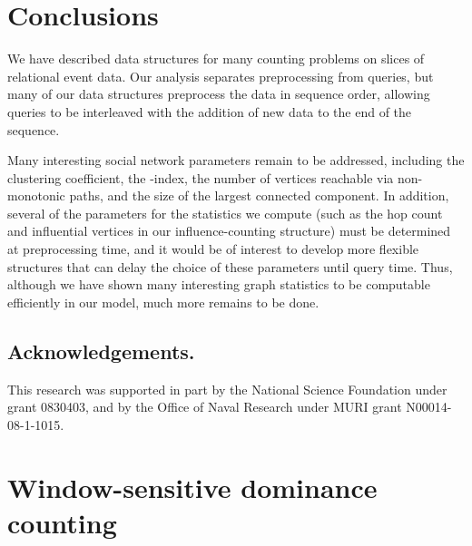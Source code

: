 \documentclass[11pt]{article}
\begin{document}
\section{Conclusions}
We have described data structures for many counting problems on slices of relational event data. Our analysis separates preprocessing from queries,  but many of our data structures preprocess the data in sequence order, allowing queries to be interleaved with the addition of new data to the end of the sequence.

Many interesting social network parameters remain to be addressed, including the clustering coefficient, the -index, the number of vertices reachable via non-monotonic paths, and the size of the largest connected component. In addition, several of the parameters for the statistics we compute (such as the hop count and  influential vertices in our influence-counting structure) must be determined at preprocessing time, and it would be of interest to develop more flexible structures that can delay the choice of these parameters until query time. Thus, although we have shown many interesting graph statistics to be computable efficiently in our model, much more remains to be done.

\newpage

\subsection*{Acknowledgements.}
This research was supported in part by the National Science Foundation under grant 0830403, and by the Office of Naval Research under MURI grant N00014-08-1-1015.

{\raggedright

}

\newpage
\appendix
\section{Window-sensitive dominance counting}
\end{document}
